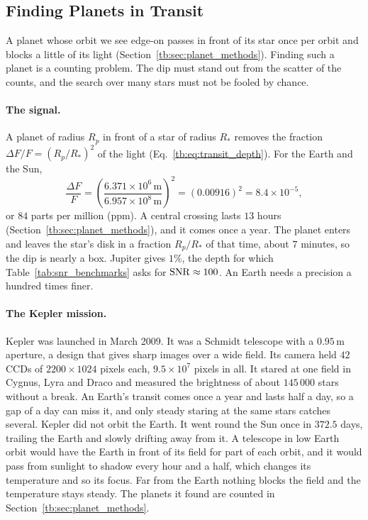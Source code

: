 \subsection{Finding Planets in Transit}
\label{cc:sec:transit}

A planet whose orbit we see edge-on passes in front of its star once per orbit and blocks a little of its light (Section~\ref{tb:sec:planet_methods}). Finding such a planet is a counting problem. The dip must stand out from the scatter of the counts, and the search over many stars must not be fooled by chance.

\paragraph{The signal.} A planet of radius $R_p$ in front of a star of radius $R_*$ removes the fraction $\Delta F/F=(R_p/R_*)^2$ of the light (Eq.~\eqref{tb:eq:transit_depth}). For the Earth and the Sun,
\[
\frac{\Delta F}{F}=\left(\frac{6.371\times10^{6}\,\mathrm m}{6.957\times10^{8}\,\mathrm m}\right)^2=(0.00916)^2=8.4\times10^{-5},
\]
or $84$ parts per million (ppm). A central crossing lasts $13$ hours (Section~\ref{tb:sec:planet_methods}), and it comes once a year. The planet enters and leaves the star's disk in a fraction $R_p/R_*$ of that time, about $7$ minutes, so the dip is nearly a box. Jupiter gives $1\%$, the depth for which Table~\ref{tab:snr_benchmarks} asks for $\mathrm{SNR}\approx100$. An Earth needs a precision a hundred times finer.

\paragraph{The Kepler mission.} Kepler was launched in March 2009. It was a Schmidt telescope with a $0.95\,\mathrm m$ aperture, a design that gives sharp images over a wide field. Its camera held $42$ CCDs of $2200\times1024$ pixels each, $9.5\times10^{7}$ pixels in all. It stared at one field in Cygnus, Lyra and Draco and measured the brightness of about $145\,000$ stars without a break. An Earth's transit comes once a year and lasts half a day, so a gap of a day can miss it, and only steady staring at the same stars catches several. Kepler did not orbit the Earth. It went round the Sun once in $372.5$ days, trailing the Earth and slowly drifting away from it. A telescope in low Earth orbit would have the Earth in front of its field for part of each orbit, and it would pass from sunlight to shadow every hour and a half, which changes its temperature and so its focus. Far from the Earth nothing blocks the field and the temperature stays steady. The planets it found are counted in Section~\ref{tb:sec:planet_methods}.

